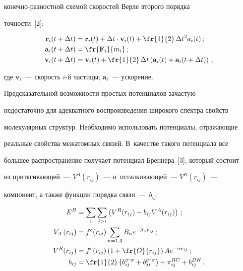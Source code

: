 ко\-неч\-но-раз\-ност\-ной схемой скоростей Верле второго порядка 

точности~[2]:

  \begin{align*}

  \mathbf{r}_i(t+\Delta t) &=\mathbf{r}_i(t)+\Delta t\cdot 

\mathbf{v}_i(t)+\fr{1}{2}\,\Delta t^2 a_i(t)\,;\\

  \mathbf{a}_i(t+\Delta t) &= \fr{\mathbf{F}_i}{m_i}\,;\\

  \mathbf{v}_i(t+\Delta t) &= \mathbf{v}_i(t)+\fr{1}{2}\,\Delta 

t\left(\mathbf{a}_i(t)+\mathbf{a}_i(t+\Delta t)\right)\,,


  \end{align*}

где $\mathbf{v}_i$~--- скорость $i$-й частицы; $\mathbf{a}_i$~--- ускорение.



  Предсказательной возможности простых потенциалов зачастую 

недостаточно для адекватного воспроизведения широкого спектра свойств 

молекулярных структур. Необходимо использовать потенциалы, отражающие 

реальные свойства межатомных связей. В~качестве такого потенциала все 

большее распространение получает потенциал Бреннера~[3], который состоит 

из притягивающей~--- $V^A(r_{ij})$~--- и~отталкивающей~--- $V^R(r_{ij})$~--- 

компонент, а также функции порядка связи~---~$b_{ij}$:

  \begin{align}

  E^B &= \sum\limits_i \sum\limits_{j>i} \left( V^R(r_{ij})-b_{ij} 

V^A(r_{ij})\right)\,;\label{e3-sem}\\

  V_A\left(r_{ij}\right) &= f^c(r_{ij})

  \sum\limits_{n=1{,}3} B_n e^{-\beta_nr_{ij}}\,; \notag %

 \\

  V^R(r_{ij}) &= f^c(r_{ij}) \left( 1+\fr{O}{r_{ij}}\right) Ae^{-\alpha 

r_{ij}}\,; \notag %

\\

  b_{ij} &= \fr{1}{2}\left( b_{ij}^{\sigma\mbox{-}\pi} + 

b_{ji}^{\sigma\mbox{-}\pi} \right)  +\pi_{ij}^{RC}+b_{ij}^{DH}\,. 

\label{e6-sem}

\end{align}

